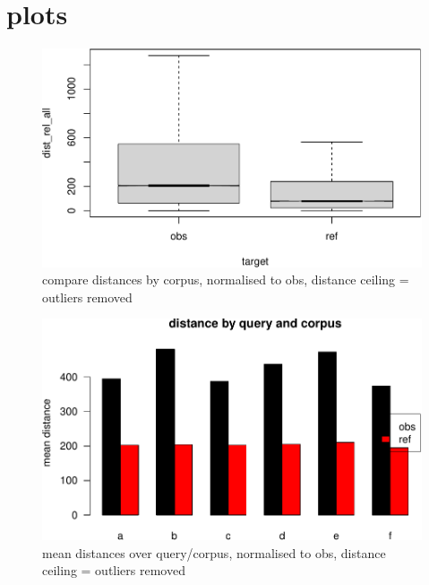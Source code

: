 \documentclass[12pt,a4paper]{article}
\begin{document}
\section{plots}\label{plots}

\begin{figure}[H]
\includegraphics{spund-pub_files/figure-latex/boxplot1-1} \caption{compare distances by corpus, normalised to obs, distance ceiling =  outliers removed}\label{fig:boxplot1}
\end{figure}

\begin{figure}[H]
\includegraphics{spund-pub_files/figure-latex/barplot-median-1} \caption{mean distances over query/corpus, normalised to obs, distance ceiling =  outliers removed}\label{fig:barplot-median}
\end{figure}
\end{document}
